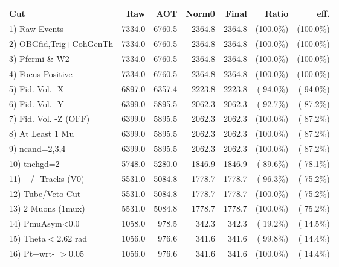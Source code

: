  \begin{table}[h!]\centering
 \begin{tabular}{||l||r|r|r|r|r|r||}
 \hline
 \hline
 Cut & Raw & AOT & Norm0 & Final & Ratio & eff.       \\
 \hline
  1) Raw Events           &       7334.0 &       6760.5 &       2364.8 &       2364.8 & (100.0\%) & (100.0\%) \\
  2) OBGfid,Trig+CohGenTh &       7334.0 &       6760.5 &       2364.8 &       2364.8 & (100.0\%) & (100.0\%) \\
  3) Pfermi \& W2         &       7334.0 &       6760.5 &       2364.8 &       2364.8 & (100.0\%) & (100.0\%) \\
  4) Focus Positive       &       7334.0 &       6760.5 &       2364.8 &       2364.8 & (100.0\%) & (100.0\%) \\
  5) Fid. Vol. -X         &       6897.0 &       6357.4 &       2223.8 &       2223.8 & ( 94.0\%) & ( 94.0\%) \\
  6) Fid. Vol. -Y         &       6399.0 &       5895.5 &       2062.3 &       2062.3 & ( 92.7\%) & ( 87.2\%) \\
  7) Fid. Vol. -Z (OFF)   &       6399.0 &       5895.5 &       2062.3 &       2062.3 & (100.0\%) & ( 87.2\%) \\
  8) At Least 1 Mu        &       6399.0 &       5895.5 &       2062.3 &       2062.3 & (100.0\%) & ( 87.2\%) \\
  9) ncand=2,3,4          &       6399.0 &       5895.5 &       2062.3 &       2062.3 & (100.0\%) & ( 87.2\%) \\
 10) tnchgd=2             &       5748.0 &       5280.0 &       1846.9 &       1846.9 & ( 89.6\%) & ( 78.1\%) \\
 11) +/- Tracks (V0)      &       5531.0 &       5084.8 &       1778.7 &       1778.7 & ( 96.3\%) & ( 75.2\%) \\
 12) Tube/Veto Cut        &       5531.0 &       5084.8 &       1778.7 &       1778.7 & (100.0\%) & ( 75.2\%) \\
 13) 2 Muons (1mux)       &       5531.0 &       5084.8 &       1778.7 &       1778.7 & (100.0\%) & ( 75.2\%) \\
 14) PmuAsym<0.0          &       1058.0 &        978.5 &        342.3 &        342.3 & ( 19.2\%) & ( 14.5\%) \\
 15) Theta$<$2.62 rad     &       1056.0 &        976.6 &        341.6 &        341.6 & ( 99.8\%) & ( 14.4\%) \\
 16) Pt+wrt- $>$0.05      &       1056.0 &        976.6 &        341.6 &        341.6 & (100.0\%) & ( 14.4\%) \\

\end{tabular}
\end{table}
